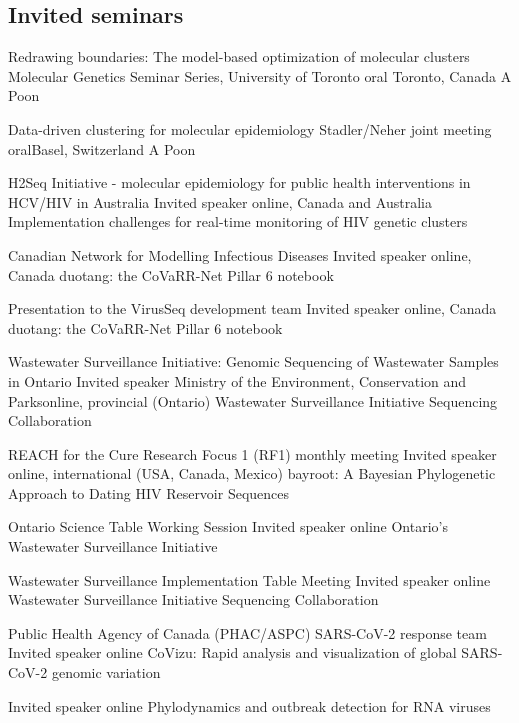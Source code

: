 \vspace{1em}
\subsection {Invited seminars}


{Redrawing boundaries: The model-based optimization of molecular clusters}
{Molecular Genetics Seminar Series, University of Toronto}
{oral}
{Toronto, Canada}
{A Poon}{}

{Data-driven clustering for molecular epidemiology}
{Stadler/Neher joint meeting}
{oral}{Basel, Switzerland}
{A Poon}{}

{H2Seq Initiative - molecular epidemiology for public health interventions in HCV/HIV in Australia}
{Invited speaker}
{}{online, Canada and Australia}
{Implementation challenges for real-time monitoring of HIV genetic clusters}

{Canadian Network for Modelling Infectious Diseases}
{Invited speaker}
{}{online, Canada}
{duotang: the CoVaRR-Net Pillar 6 notebook}

{Presentation to the VirusSeq development team}
{Invited speaker}
{}{online, Canada}
{duotang: the CoVaRR-Net Pillar 6 notebook}

{Wastewater Surveillance Initiative: Genomic Sequencing of Wastewater Samples in Ontario}
{Invited speaker}
{Ministry of the Environment, Conservation and Parks}{online, provincial (Ontario)}
{Wastewater Surveillance Initiative Sequencing Collaboration}

{REACH for the Cure Research Focus 1 (RF1) monthly meeting}
{Invited speaker}
{}{online, international (USA, Canada, Mexico)}
{bayroot: A Bayesian Phylogenetic Approach to Dating HIV Reservoir Sequences}

{Ontario Science Table Working Session}
{Invited speaker}
{}{online}
{Ontario's Wastewater Surveillance Initiative}


{Wastewater Surveillance Implementation Table Meeting}
{Invited speaker}
{}{online}
{Wastewater Surveillance Initiative Sequencing Collaboration}


{Public Health Agency of Canada (PHAC/ASPC) SARS-CoV-2 response team}
{Invited speaker}
{}{online}
{CoVizu: Rapid analysis and visualization of global SARS-CoV-2 genomic variation}

{Invited speaker}
{}{online}
{Phylodynamics and outbreak detection for RNA viruses}




